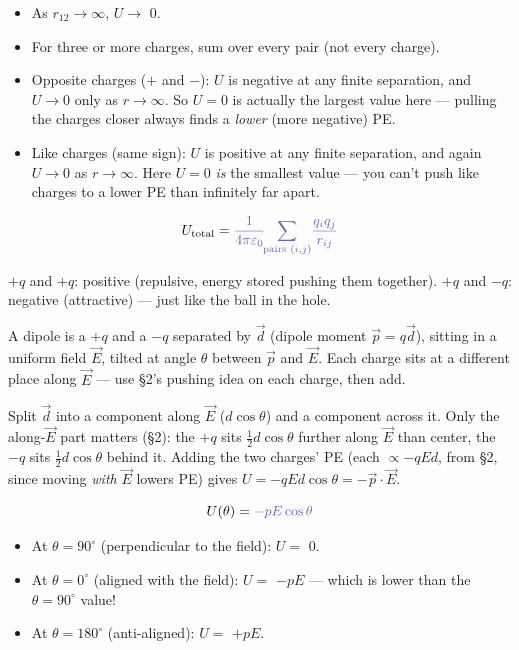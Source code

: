 \documentclass[12pt]{article}
\newcommand{\ANS}[1]{\textcolor{accent}{#1}}
\begin{document}
\begin{itemize}[itemsep=9pt,parsep=4pt,topsep=4pt]
\item As $r_{12}\to\infty$, $U\to$ \ANS{$0$}.
\item For three or more charges, sum over every \ANS{pair} (not every charge).
\item Opposite charges ($+$ and $-$): $U$ is \ANS{negative} at any finite
separation, and $U\to0$ only as $r\to\infty$. So $U=0$ is actually the
\ANS{largest} value here --- pulling the charges closer always finds a
\emph{lower} (more negative) PE.
\item Like charges (same sign): $U$ is \ANS{positive} at any finite separation,
and again $U\to0$ as $r\to\infty$. Here $U=0$ \emph{is} the \ANS{smallest}
value --- you can't push like charges to a lower PE than infinitely far
apart.
\end{itemize}

\[
U_{\text{total}} = \ANS{\dfrac{1}{4\pi\varepsilon_0}\!\!\sum_{\text{pairs }(i,j)}\!\dfrac{q_i q_j}{r_{ij}}}
\]


{\small\color{accent} $+q$ and $+q$: positive (repulsive, energy stored pushing
them together). $+q$ and $-q$: negative (attractive) --- just like the ball
in the hole.}


A dipole is a $+q$ and a $-q$ separated by $\vec d$ (dipole moment
$\vec p = q\vec d$), sitting in a uniform field $\vec E$, tilted at angle
$\theta$ between $\vec p$ and $\vec E$. Each charge sits at a different
place along $\vec E$ --- use \S2's pushing idea on each charge, then add.

{\small\color{accent} Split $\vec d$ into a component along $\vec E$
($d\cos\theta$) and a component across it. Only the along-$\vec E$ part
matters (\S2): the $+q$ sits $\tfrac12 d\cos\theta$ further along $\vec E$
than center, the $-q$ sits $\tfrac12 d\cos\theta$ behind it. Adding the two
charges' PE (each $\propto -qEd$, from \S2, since moving \emph{with} $\vec
E$ lowers PE) gives $U=-qEd\cos\theta = -\vec p\cdot\vec E$.}

\[
U(\theta) = \ANS{-pE\cos\theta}
\]

\begin{itemize}[itemsep=9pt,parsep=4pt,topsep=4pt]
\item At $\theta=90^\circ$ (perpendicular to the field): $U=$ \ANS{$0$}.
\item At $\theta=0^\circ$ (aligned with the field): $U=$ \ANS{$-pE$} ---
which is \ANS{lower} than the $\theta=90^\circ$ value!
\item At $\theta=180^\circ$ (anti-aligned): $U=$ \ANS{$+pE$}.
\end{itemize}
\end{document}
